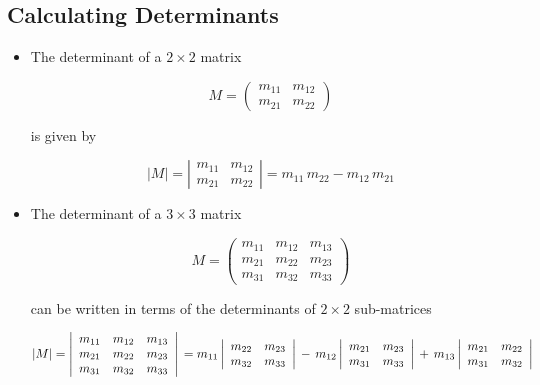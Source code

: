\documentclass[12pt]{article}
\begin{document}
\begin{latexonly}
\subsection*{Calculating Determinants}
\end{latexonly}

\begin{itemize}
\item The determinant of a $2 \times 2$ matrix

  \begin{equation}
M = 
\left(
\begin{array}{cccc}
m_{11}  & m_{12} \\
m_{21}  & m_{22} 
\end{array}
\right)
\end{equation}

\noindent
is given by

\begin{equation}
|M| = 
\left|
\begin{array}{cccc}
m_{11}  & m_{12} \\
m_{21}  & m_{22} 
\end{array}
\right|
= m_{11} \, m_{22} - m_{12} \, m_{21}
\end{equation}

\item The determinant of a $3 \times 3$ matrix

\begin{equation}
M =
\left(
\begin{array}{cccc}
m_{11}  & m_{12} & m_{13} \\
m_{21}  & m_{22} & m_{23} \\
m_{31}  & m_{32} & m_{33} 
\end{array}
\right)
\end{equation}

\noindent
can be written in terms of the determinants of $2 \times 2$
sub-matrices 

\begin{equation}
|M| =
\left|
\begin{array}{cccc}
m_{11}  & m_{12} & m_{13} \\
m_{21}  & m_{22} & m_{23} \\
m_{31}  & m_{32} & m_{33} 
\end{array}
\right| \\
= m_{11} 
\left|
\begin{array}{cccc}
m_{22}  & m_{23} \\
m_{32}  & m_{33} 
\end{array}
\right| 
\,-\, m_{12} 
\left|
\begin{array}{cccc}
m_{21}  & m_{23} \\
m_{31}  & m_{33} 
\end{array}
\right| 
\,+\, m_{13} 
\left|
\begin{array}{cccc}
m_{21}  & m_{22} \\
m_{31}  & m_{32} 
\end{array}
\right|
\end{equation}


\end{itemize}
\end{document}
